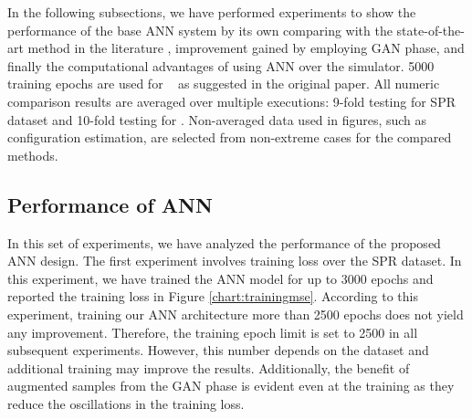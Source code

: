 \documentclass[journal]{IEEEtran}
\begin{document}
In the following subsections, we have performed experiments to show the performance of the base ANN system by its own comparing with the state-of-the-art method in the literature \cite{paper0}, improvement gained by employing GAN phase, and finally the computational advantages of using ANN over the simulator. 5000 training epochs are used for  \cite{paper0} as suggested in the original paper. All numeric comparison results are averaged over multiple executions: 9-fold testing for SPR dataset and 10-fold testing for \dszero. Non-averaged data used in figures, such as configuration estimation, are selected from non-extreme cases for the compared methods.
%
%

\subsection{Performance of ANN}

In this set of experiments, we have analyzed the performance of the proposed ANN design. The first experiment involves training loss over the SPR dataset. In this experiment, we have trained the ANN model for up to 3000 epochs and reported the training loss in Figure \ref{chart:trainingmse}. According to this experiment, training our ANN architecture more than 2500 epochs does not yield any improvement. Therefore, the training epoch limit is set to 2500 in all subsequent experiments. However, this number depends on the dataset and additional training may improve the results. Additionally, the benefit of augmented samples from the GAN phase is evident even at the training as they reduce the oscillations in the training loss.
\end{document}
